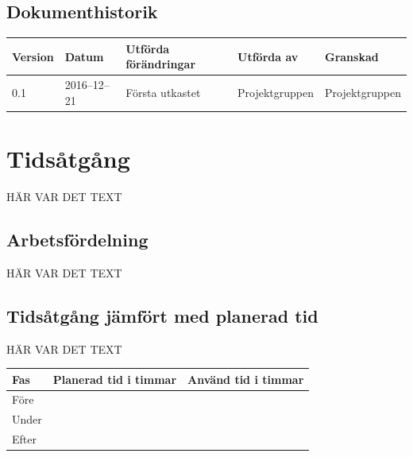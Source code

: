 \documentclass[a4paper,titlepage,12pt]{article}
\begin{document}
\begin{center}
		
		
		\section*{Dokumenthistorik}
		\renewcommand*{\arraystretch}{1.4}
		\begin{longtable}[c]{ l l >{\raggedright}p{5cm} >{\raggedright}p{3cm} l }
			\textbf{Version} & \textbf{Datum} & \textbf{Utförda förändringar} 
			& \textbf{Utförda av} & \textbf{Granskad} \\ \midrule
			
			0.1 & 2016--12--21 & Första utkastet & Projektgruppen &
			Projektgruppen \\
			
		\end{longtable}
	\end{center}
	
	
	\newpage
	
	\raggedright
	
	\section{Tidsåtgång}
	HÄR VAR DET TEXT
	
	\subsection{Arbetsfördelning}
	HÄR VAR DET TEXT
	
	\subsection{Tidsåtgång jämfört med planerad tid}
	HÄR VAR DET TEXT
	
	\begin{longtable}[c]{l l l }
		\textbf{Fas} & \textbf{Planerad tid i timmar} & \textbf{Använd tid i timmar} \\ \midrule
		Före &  &  \\
		Under &  &  \\
		Efter &  &  \\
	\end{longtable}
	
\end{document}
